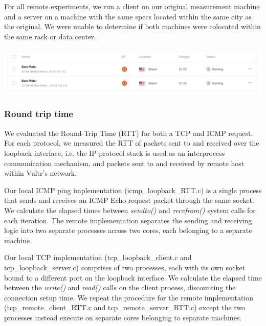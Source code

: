 \documentclass{article}
\begin{document}
For all remote experiments, we run a client on our original measurement machine and a server on a machine with the same specs
located within the same city as the original. We were unable to determine if both machines were colocated within the same
rack or data center.

\includegraphics[width=\textwidth]{servers.png}

\subsubsection{Round trip time} 

We evaluated the Round-Trip Time (RTT) for both a TCP and ICMP request. For each protocol, we measured the RTT of packets
sent to and received over the loopback interface, i.e. the IP protocol stack is used as an interprocess communication mechanism, 
and packets sent to and received by remote host within Vultr's network.

Our local ICMP ping implementation (icmp\_loopback\_RTT.c) is a single process that sends and receives an ICMP Echo request packet 
through the same socket. We calculate the elapsed times between \textit{sendto()} and \textit{recvfrom()} system calls for each 
iteration. The remote implementation separates the sending and receiving logic into two separate processes across two cores, 
each belonging to a separate machine. 

Our local TCP implementation (tcp\_loopback\_client.c and tcp\_loopback\_server.c) comprises of two processes, each with its own 
socket bound to a different port on the loopback interface. We calculate the elapsed time between the \textit{write()} and 
\textit{read()} calls on the client process, discounting the connection setup time. We repeat the procedure for the remote
implementation (tcp\_remote\_client\_RTT.c and tcp\_remote\_server\_RTT.c) except the two processes instead execute on separate 
cores belonging to separate machines. 


\end{document}
